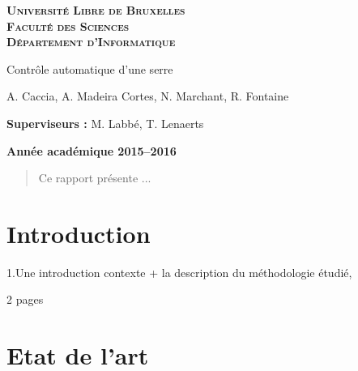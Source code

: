 \documentclass[a4paper,10pt]{report}
\begin{document}
\begin{titlepage}
    \begin{center}
        \textbf{\textsc{Université Libre de Bruxelles}}\\
        \textbf{\textsc{Faculté des Sciences}}\\
        \textbf{\textsc{Département d'Informatique}}

        \vfill{}
        \vfill{}

        \begin{center}
            {\Huge Contrôle automatique d'une serre}
        \end{center}

        {\Huge \par}

        \begin{center}
            {\large A. Caccia, A. Madeira Cortes, N. Marchant, R. Fontaine}
        \end{center}

        {\Huge \par}
        \vfill{}
        \vfill{}

        \begin{flushleft}
            {\large \textbf{Superviseurs :} M. Labbé, T. Lenaerts}
            \hfill{}
        \end{flushleft}

        {\large\par}
        \vfill{}
        \vfill{}

        \textbf{Année académique 2015--2016}
    \end{center}
\end{titlepage}

\begin{abstract}
Ce rapport présente ...
\end{abstract}


\tableofcontents


\chapter{Introduction}
1.Une introduction contexte + la description du méthodologie étudié,

2 pages

\chapter{Etat de l'art}
\end{document}
